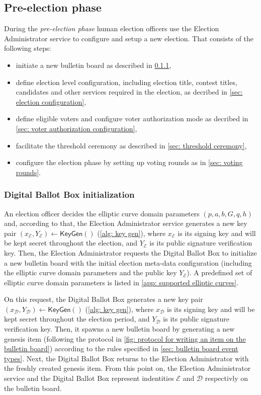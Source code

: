 \subsection{Pre-election phase} \label{sec: pre-election phase}
During the \textit{pre-election phase} human election officers use the Election Administrator service to configure and setup a new election. That consists of the following steps:
\begin{itemize}
    \item initiate a new bulletin board as described in \cref{sec: digital ballot box initialization},
    \item define election level configuration, including election title, contest titles, candidates and other services required in the election, as decribed in \cref{sec: election configuration},
    \item define eligible voters and configure voter authorization mode as decribed in \cref{sec: voter authorization configuration},
    \item facilitate the threshold ceremony as described in \cref{sec: threshold ceremony},
    \item configure the election phase by setting up voting rounds as in \cref{sec: voting rounds}.
\end{itemize}


\subsubsection{Digital Ballot Box initialization} \label{sec: digital ballot box initialization}
An election officer decides the elliptic curve domain parameters $(p, a, b, G, q, h)$ and, according to that, the Election Administrator service generates a new key pair $(x_\mathcal{E}, Y_\mathcal{E}) \gets \mathsf{KeyGen}()$ (\cref{alg: key gen}), where $x_\mathcal{E}$ is its signing key and will be kept secret throughout the election, and $Y_\mathcal{E}$ is its public signature verification key. Then, the Election Administrator requests the Digital Ballot Box to initialize a new bulletin board with the initial election meta-data configuration (including the elliptic curve domain parameters and the public key $Y_\mathcal{E}$). A predefined set of elliptic curve domain parameters is listed in \cref{app: supported elliptic curves}.

On this request, the Digital Ballot Box generates a new key pair $(x_\mathcal{D}, Y_\mathcal{D}) \gets \mathsf{KeyGen}()$ (\cref{alg: key gen}), where $x_\mathcal{D}$ is its signing key and will be kept secret throughout the election period, and $Y_\mathcal{D}$ is its public signature verification key. Then, it spawns a new bulletin board by generating a new genesis item (following the protocol in \cref{fig: protocol for writing an item on the bulletin board}) according to the rules specified in \cref{sec: bulletin board event types}. Next, the Digital Ballot Box returns to the Election Administrator with the freshly created genesis item. From this point on, the Election Administrator service and the Digital Ballot Box represent indentities $\mathcal{E}$ and $\mathcal{D}$ respectivly on the bulletin board.


